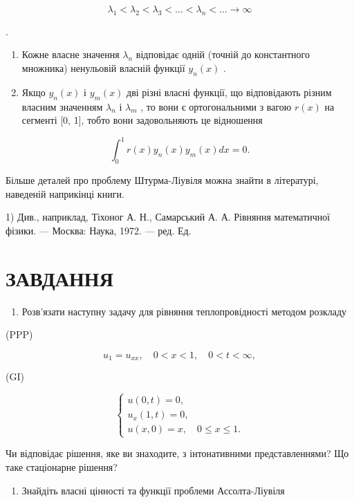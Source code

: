 \documentclass[
  ukrainian,
]{article}
\providecommand{\tightlist}{%
  \setlength{\itemsep}{0pt}\setlength{\parskip}{0pt}}
\begin{document}
\[
\lambda_1 < \lambda_2 < \lambda_3 < \ldots < \lambda_n < \ldots \to \infty
\]

.

\begin{enumerate}
\def\labelenumi{\arabic{enumi}.}
\setcounter{enumi}{1}
\item
  Кожне власне значення \(\lambda_n\) відповідає одній (точній до
  константного множника) ненульовій власній функції \(y_n(x)\) .
\item
  Якщо \(y_n(x)\) і \(y_m(x)\) дві різні власні функції, що відповідають
  різним власним значенням \(\lambda_n\) і \(\lambda_m\) , то вони є
  ортогональними з вагою \(r(x)\) на сегменті {[}0, 1{]}, тобто вони
  задовольняють це відношення
\end{enumerate}

\[
\int_{0}^{1} r(x) y_{n}(x) y_{m}(x) dx = 0.
\]

Більше деталей про проблему Штурма-Ліувіля можна знайти в літературі,
наведеній наприкінці книги.

1) Див., наприклад, Тіхоног А. Н., Самарський А. А. Рівняння
математичної фізики. --- Москва: Наука, 1972. --- ред. Ед.

\section{ЗАВДАННЯ}\label{ux437ux430ux432ux434ux430ux43dux43dux44f-5}

\begin{enumerate}
\def\labelenumi{\arabic{enumi}.}
\tightlist
\item
  Розв'язати наступну задачу для рівняння теплопровідності методом
  розкладу
\end{enumerate}

(PPP)

\[
u_1 = u_{xx}, \quad 0 < x < 1, \quad 0 < t < \infty,
\]

(GI)

\[
\begin{cases} u(0, t) = 0, \\ u_x(1, t) = 0, \\ u(x, 0) = x, \quad 0 \le x \le 1. \end{cases}
\]

Чи відповідає рішення, яке ви знаходите, з інтонативними
представленнями? Що таке стаціонарне рішення?

\begin{enumerate}
\def\labelenumi{\arabic{enumi}.}
\setcounter{enumi}{1}
\tightlist
\item
  Знайдіть власні цінності та функції проблеми Ассолта-Ліувіля
\end{enumerate}
\end{document}
